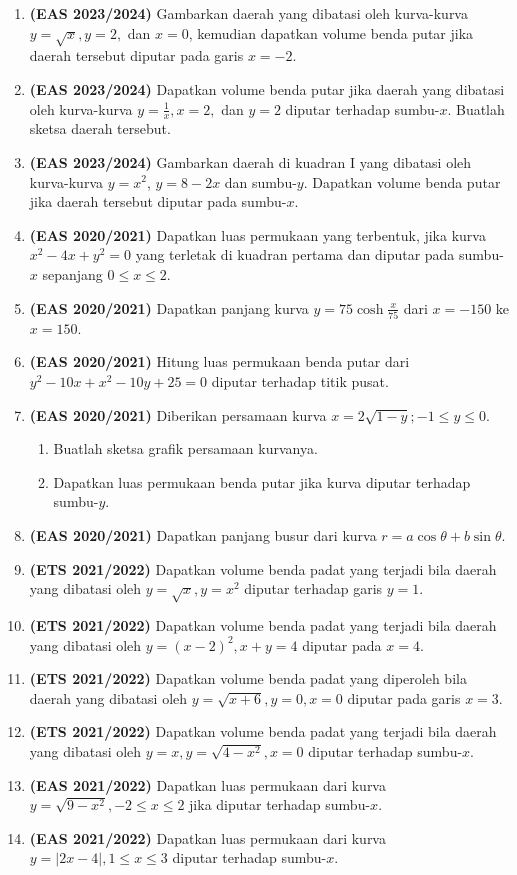\documentclass{article}
\begin{document}
\begin{enumerate}
    \item\textbf{(EAS 2023/2024)} Gambarkan daerah yang dibatasi oleh kurva-kurva $y=\sqrt{x}, y=2,$ dan $x=0$, kemudian dapatkan volume benda putar jika daerah tersebut diputar pada garis $x=-2$.
    \item\textbf{(EAS 2023/2024)} Dapatkan volume benda putar jika daerah yang dibatasi oleh kurva-kurva $y=\frac{1}{x}, x=2,$ dan $y=2$ diputar terhadap sumbu-$x$. Buatlah sketsa daerah tersebut.
        \item\textbf{(EAS 2023/2024)} Gambarkan daerah di kuadran I yang dibatasi oleh kurva-kurva $y=x^2$, $y=8-2x$ dan sumbu-$y$. Dapatkan volume benda putar jika daerah tersebut diputar pada sumbu-$x$.
    \item\textbf{(EAS 2020/2021)} Dapatkan luas permukaan yang terbentuk, jika kurva $x^2-4x+y^2=0$ yang terletak di kuadran pertama dan diputar pada sumbu-$x$ sepanjang $0\leq x\leq 2$.
    \item \textbf{(EAS 2020/2021)} Dapatkan panjang kurva $y=75\cosh \frac{x}{75}$ dari $x=-150$ ke $x=150$.
    \item \textbf{(EAS 2020/2021)} Hitung luas permukaan benda putar dari $y^2-10x+x^2-10y+25=0$ diputar terhadap titik pusat. 
    \item \textbf{(EAS 2020/2021)} Diberikan persamaan kurva $x=2\sqrt{1-y};-1\leq y\leq 0$.
    \begin{enumerate}
        \item Buatlah sketsa grafik persamaan kurvanya.
        \item Dapatkan luas permukaan benda putar jika kurva diputar terhadap sumbu-$y$.
    \end{enumerate}
    \item \textbf{(EAS 2020/2021)} Dapatkan panjang busur dari kurva $r=a\cos\theta+b\sin\theta$.
    \item \textbf{(ETS 2021/2022)} Dapatkan volume benda padat yang terjadi bila daerah yang dibatasi oleh $y=\sqrt{x}, y=x^2$ diputar terhadap garis $y=1$.
    \item \textbf{(ETS 2021/2022)} Dapatkan volume benda padat yang terjadi bila daerah yang dibatasi oleh $y=(x-2)^2,x+y=4$ diputar pada $x=4$.
    \item \textbf{(ETS 2021/2022)} Dapatkan volume benda padat yang diperoleh bila daerah yang dibatasi oleh $y=\sqrt{x+6},y=0,x=0$ diputar pada garis $x=3$.
    \item \textbf{(ETS 2021/2022)} Dapatkan volume benda padat yang terjadi bila daerah yang dibatasi oleh $y=x,y=\sqrt{4-x^2},x=0$ diputar terhadap sumbu-$x$.
    \item \textbf{(EAS 2021/2022)} Dapatkan luas permukaan dari kurva $y=\sqrt{9-x^2},-2\leq x\leq 2$ jika diputar terhadap sumbu-$x$.
    \item \textbf{(EAS 2021/2022)} Dapatkan luas permukaan dari kurva $y=|2x-4|,1\leq x\leq 3$ diputar terhadap sumbu-$x$.
   
\end{enumerate}
\end{document}
